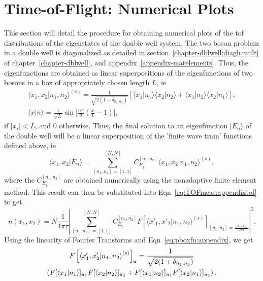 \section{\label{sec:3:appendixtof} Time-of-Flight: Numerical Plots}
This section will detail the procedure for obtaining numerical plots of the tof distributions of the eigenstates of the double well system. The two boson problem in a double well is diagonalized as detailed in section~\ref{chapter-dblwell:diaghamilt} of chapter~\ref{chapter-dblwell}, and appendix~\ref{appendix-matelements}. Thus, the eigenfunctions are obtained as linear superpositions of the eigenfunctions of two bosons in a box of appropriately chosen length $L$, ie
\begin{eqnarray}
{\langle}x_1,x_2\vert n_1,n_2{\rangle} ^{(s)}=\frac{1}{\sqrt{2(1+\delta_{n_1,n_2})}} 
[{\langle}x_1|n_1\rangle{\langle}x_2|n_2\rangle +{\langle}x_1|n_2\rangle{\langle}x_2|n_1\rangle ], \nonumber \\
\langle x|n\rangle=\frac{1}{\sqrt{L}} \sin{\biggl[}{\frac{n\pi}{2}(\frac{x}{L}-1){\biggr]}},
\label{eq:pboxfn:appendix}
\end{eqnarray}
 if $|x_i|<L$, and $0$ otherwise. Thus, the final solution to an eigenfunction $|E_n\rangle$ of the double well will be a linear superposition of the  'finite wave train'  functions defined above, ie
\begin{equation}
\langle x_1,x_2|E_n\rangle =  \sum_{\left[n_1,n_2\right]=\left[1,1\right]}^{\left[ N,N \right]} C^{\left[n_1,n_2 \right]}_{E_j} {\langle}x_1,x_2\vert n_1,n_2{\rangle} ^{(s)},
\end{equation}
where the $C^{\left[n_1,n_2 \right]}_{E_j}$ are obtained numerically using the nonadaptive finite element method. This result can then be substituted into Eqn~\ref{eq:TOFmeas:appendixtof} to get
\begin{equation}
n(x_1,x_2) = N \frac{1}{4\pi\tau} |\sum_{\left[n_1,n_2\right]=\left[1,1\right]}^{\left[ N,N \right]} C^{\left[n_1,n_2 \right]}_{E_j} F\left[ {\langle}x'_1,x'_2\vert n_1,n_2{\rangle} ^{(s)} \right]_{\left[u_1,u_2\right]=\frac{\left[ x_1,x_2 \right]}{4\pi\tau}}|^2.
\label{eq:density:appendix}
\end{equation}
Using the linearity of Fourier Transforms and Eqn~\ref{eq:pboxfn:appendix}, we get
\begin{multline}
F\left[ {\langle}x'_1,x'_2\vert n_1,n_2{\rangle} ^{(s)} \right]_{\bf u}=\frac{1}{\sqrt{2(1+\delta_{n_1,n_2})}}\\
\left( F[{\langle}x_1|n_1\rangle]_{u_1} F[{\langle}x_2|n_2\rangle]_{u_2} +F[{\langle}x_1|n_2\rangle]_{u_1} F[{\langle}x_2|n_1\rangle]_{u_2}  \right).
\label{eq:ft:appendix}
\end{multline}
